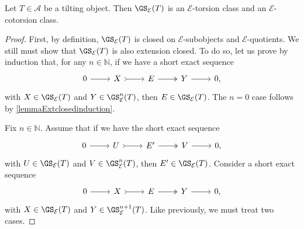 \begin{prop}
\label{prop:Extclosed}
Let $T \in \mathscr{A}$ be a tilting object. Then $\GS_{\mathcal{E}}(T)$ is an ${\mathcal{E}}$-torsion class and an ${\mathcal{E}}$-cotorsion class.
\end{prop}

\begin{proof}
First, by definition, $\GS_{\mathcal{E}}(T)$ is closed on ${\mathcal{E}}$-subobjects and ${\mathcal{E}}$-quotients. We still must show that $\GS_{\mathcal{E}}(T)$ is also extension closed. To do so, let us prove by induction that, for any $n \in \mathbb{N}$, if we have a short exact sequence
\[\begin{tikzcd}
	0 & X & E  & Y &  0,
	\arrow[from=1-1, to=1-2]
	\arrow[tail, from=1-2, to=1-3]
	\arrow[two heads,from=1-3, to=1-4]
	\arrow[from=1-4, to=1-5]
\end{tikzcd} \] with  $X\in \GS_{\mathcal{E}}(T)$ and $Y\in \GS^n_{\mathcal{E}} (T)$, then $E \in  \GS_{\mathcal{E}}(T)$. The $n=0$ case follows by \cref{lemmaExtclosedinduction}.

Fix $n \in \mathbb{N}$. Assume that if we have the short exact sequence 
\[\begin{tikzcd}
	0 & U & E' & V &  0,
	\arrow[from=1-1, to=1-2]
	\arrow[tail, from=1-2, to=1-3]
	\arrow[two heads,from=1-3, to=1-4]
	\arrow[from=1-4, to=1-5]
\end{tikzcd} \]
with $U \in \GS_{\mathcal{E}}(T)$ and $V \in \GS^{n}_{\mathcal{E}}(T)$, then $E' \in \GS_{\mathcal{E}}(T)$. Consider a short exact sequence \[\begin{tikzcd}
	0 & X & E  & Y &  0,
	\arrow[from=1-1, to=1-2]
	\arrow[tail, from=1-2, to=1-3]
	\arrow[two heads,from=1-3, to=1-4]
	\arrow[from=1-4, to=1-5]
\end{tikzcd} \] with $X \in \GS_\mathcal{E}(T)$ and $Y \in \GS_\mathcal{E}^{n+1}(T)$. Like previously, we must treat two cases.


\end{proof}
